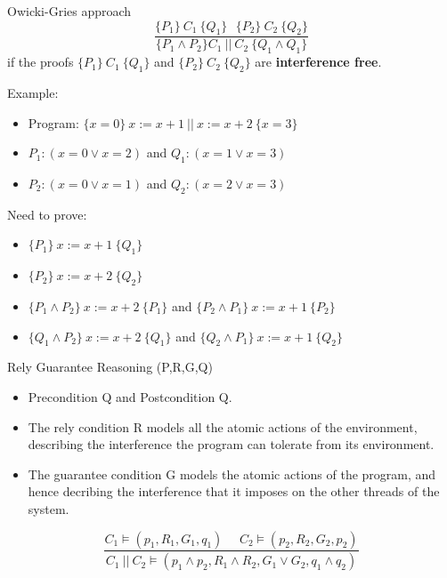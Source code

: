 \documentclass[11pt]{beamer}
\begin{document}
\begin{frame}{Owicki-Gries approach}
  $$\frac{\{P_1\}~C_1~\{Q_1\}~~~\{P_2\}~C_2~\{Q_2\}}{\{P_1 \land P_2\} C_1~||~C_2~\{Q_1 \land Q_1\}}$$
  if the proofs $\{P_1\}~C_1~\{Q_1\}$ and $\{P_2\}~C_2~\{Q_2\}$ are {\bf interference free}.
  \pause

  Example:
  \begin{itemize}
  \item Program: $\{x = 0\}~ x := x + 1 ~||~ x := x + 2 ~\{x = 3\}$
    \pause
    \item $P_1:  (x = 0 \lor x = 2)$ and $Q_1: (x = 1 \lor x = 3)$
    \item $P_2: (x = 0 \lor x = 1)$ and $Q_2: (x = 2 \lor x = 3)$
    \end{itemize}
\pause
Need to prove:
\begin{itemize}
\item $\{P_1\}~ x := x + 1~ \{Q_1\}$
\item $\{P_2\}~ x := x + 2 ~\{Q_2\}$
  \pause
\item $\{P_1 \land P_2\}~ x := x + 2 ~\{P_1\} $ and $\{P_2 \land P_1\} ~x := x + 1 ~\{P_2\} $
  \item $\{Q_1 \land P_2\}~ x := x + 2 ~\{Q_1\} $ and  $\{Q_2 \land P_1\}~ x := x + 1 ~\{Q_2\} $
\end{itemize}
\end{frame}

\begin{frame}{Rely Guarantee Reasoning (P,R,G,Q)}
  \begin{itemize}
  \item Precondition Q and Postcondition Q.
  \item The rely condition R models all the atomic actions of the environment,
    describing the interference the  program can tolerate from its environment.
  \item The guarantee condition G models the atomic actions of the program, and
    hence decribing the interference that it imposes on the other threads of the system.
  \end{itemize}
  \pause
  $$\frac{C_1 \models (p_1, R_1,G_1,q_1)~~~~~~ C_2 \models (p_2, R_2, G_2, p_2)}{C_1~||~C_2 \models (p_1 \land
    p_2, R_1 \land R_2, G_1 \lor G_2, q_1 \land q_2)}$$
\end{frame}
\end{document}
